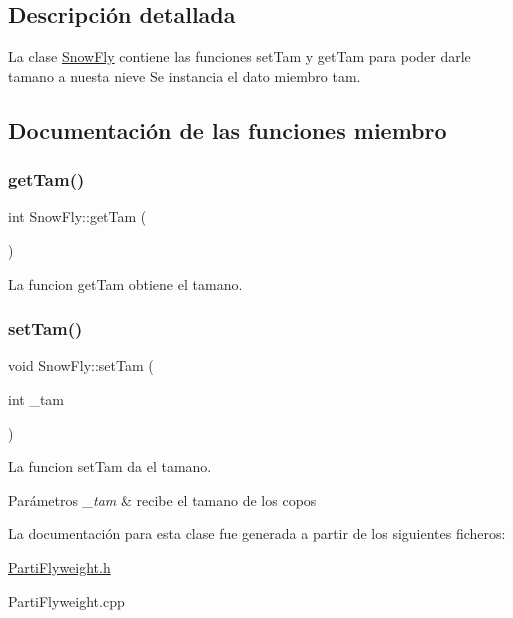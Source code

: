 \subsection{Descripción detallada}
La clase \hyperlink{classSnowFly}{Snow\+Fly} contiene las funciones set\+Tam y get\+Tam para poder darle tamano a nuesta nieve  Se instancia el dato miembro tam. 

\subsection{Documentación de las funciones miembro}
\mbox{\label{classSnowFly_a6677ebdc7b0cb9bb7ea1b90292b18ef2}} 
\subsubsection{\texorpdfstring{get\+Tam()}{getTam()}}
{\footnotesize\ttfamily int Snow\+Fly\+::get\+Tam (\begin{DoxyParamCaption}{ }\end{DoxyParamCaption})}

La funcion get\+Tam obtiene el tamano. \mbox{\label{classSnowFly_a1068f2ce770daa2932732ec6c94715a9}} 
\subsubsection{\texorpdfstring{set\+Tam()}{setTam()}}
{\footnotesize\ttfamily void Snow\+Fly\+::set\+Tam (\begin{DoxyParamCaption}\item[{int}]{\+\_\+tam }\end{DoxyParamCaption})}

La funcion set\+Tam da el tamano. 
\begin{DoxyParams}{Parámetros}
{\em \+\_\+tam} & recibe el tamano de los copos \\
\hline
\end{DoxyParams}


La documentación para esta clase fue generada a partir de los siguientes ficheros\+:\begin{DoxyCompactItemize}
\item 
\hyperlink{PartiFlyweight_8h}{Parti\+Flyweight.\+h}\item 
Parti\+Flyweight.\+cpp\end{DoxyCompactItemize}
